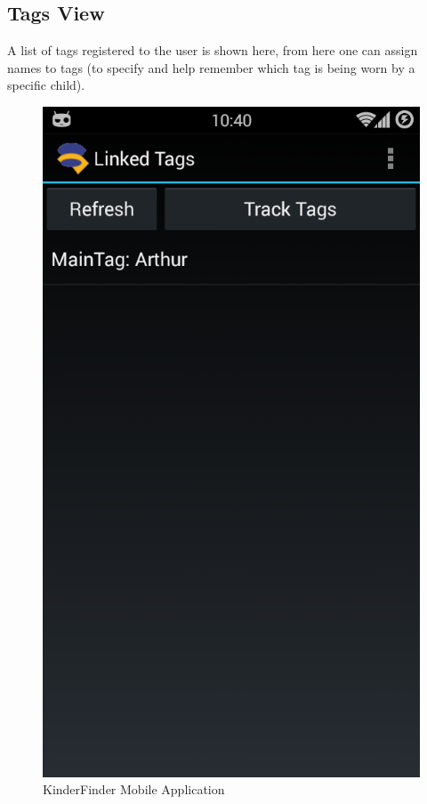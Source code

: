\documentclass{article}
\begin{document}
\subsection{Tags View}
A list of tags registered to the user is shown here, from here one can assign names to tags (to specify and help remember which tag is being worn by a specific child).
\begin{figure}[H]
\centering
\includegraphics[scale=0.4]{Main App - View Tags.png}
\caption{KinderFinder Mobile Application}
\end{figure}
\end{document}
